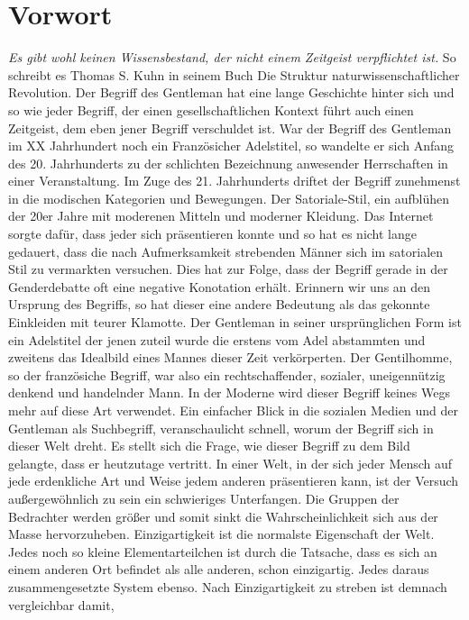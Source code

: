 \chapter{Vorwort}
\textit{\glqq Es gibt wohl keinen Wissensbestand, der nicht einem Zeitgeist verpflichtet ist.\grqq} 
So schreibt es Thomas S. Kuhn in seinem Buch \glqq Die Struktur naturwissenschaftlicher Revolution.\grqq
Der Begriff des Gentleman hat eine lange Geschichte hinter sich und so wie jeder Begriff, der einen
gesellschaftlichen Kontext führt auch einen Zeitgeist, dem eben jener Begriff verschuldet ist.
War der Begriff des Gentleman im XX Jahrhundert noch ein Französicher Adelstitel, so wandelte er sich Anfang des
20. Jahrhunderts zu der schlichten Bezeichnung anwesender Herrschaften in einer Veranstaltung. Im Zuge
des 21. Jahrhunderts driftet der Begriff zunehmenst in die modischen Kategorien und Bewegungen.
Der Satoriale-Stil, ein aufblühen der 20er Jahre mit moderenen Mitteln und moderner Kleidung.
Das Internet sorgte dafür, dass jeder sich präsentieren konnte und so hat es nicht lange gedauert, dass
die nach Aufmerksamkeit strebenden Männer sich im satorialen Stil zu vermarkten versuchen. Dies hat zur Folge,
dass der Begriff gerade in der Genderdebatte oft eine negative Konotation erhält. Erinnern wir uns an den Ursprung des
Begriffs, so hat dieser eine andere Bedeutung als das gekonnte Einkleiden mit teurer Klamotte.
Der Gentleman in seiner ursprünglichen Form ist ein Adelstitel der jenen zuteil wurde die erstens vom
Adel abstammten und zweitens das Idealbild eines Mannes dieser Zeit verkörperten. Der Gentilhomme, so der
französiche Begriff, war also ein rechtschaffender, sozialer, uneigennützig denkend und handelnder Mann.
In der Moderne wird dieser Begriff keines Wegs mehr auf diese Art verwendet. Ein einfacher Blick in die
\glqq sozialen \grqq Medien und der Gentleman als Suchbegriff, veranschaulicht schnell, worum der Begriff sich
in dieser Welt dreht. Es stellt sich die Frage, wie dieser Begriff zu dem Bild gelangte, dass er heutzutage vertritt.
In einer Welt, in der sich jeder Mensch auf jede erdenkliche Art und Weise jedem anderen präsentieren kann, ist
der Versuch außergewöhnlich zu sein ein schwieriges Unterfangen. Die Gruppen der Bedrachter werden größer und somit
sinkt die Wahrscheinlichkeit sich aus der Masse hervorzuheben. Einzigartigkeit ist die normalste Eigenschaft der Welt.
Jedes noch so kleine Elementarteilchen ist durch die Tatsache, dass es sich an einem anderen Ort befindet als alle anderen,
schon einzigartig. Jedes daraus zusammengesetzte System ebenso. Nach Einzigartigkeit zu streben ist demnach vergleichbar damit,
